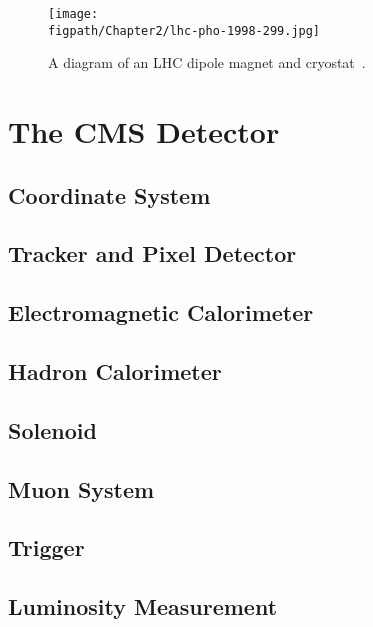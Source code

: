 \begin{figure}[tb]
	\centering
	\texttt{[image: \\figpath/Chapter2/lhc-pho-1998-299.jpg]}
	\caption{A diagram of an LHC dipole magnet and cryostat~\cite{Dailler:842253}.}
	\label{fig:CERN_accelerator_complex}
\end{figure}


\section{The CMS Detector}
\subsection{Coordinate System}
\subsection{Tracker and Pixel Detector}
\subsection{Electromagnetic Calorimeter}
\subsection{Hadron Calorimeter}
\subsection{Solenoid}
\subsection{Muon System}
\subsection{Trigger}
\subsection{Luminosity Measurement}
